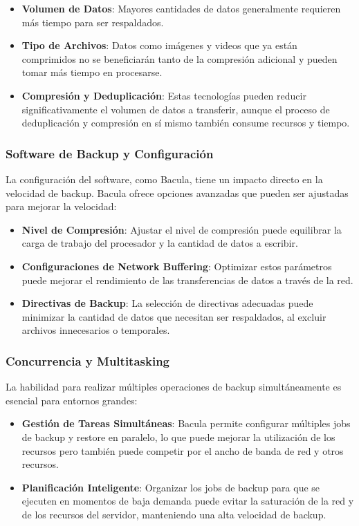 \begin{itemize}
    \item \textbf{Volumen de Datos}: Mayores cantidades de datos generalmente requieren más tiempo para ser respaldados.
    \item \textbf{Tipo de Archivos}: Datos como imágenes y videos que ya están comprimidos no se beneficiarán tanto de la compresión adicional y pueden tomar más tiempo en procesarse.
    \item \textbf{Compresión y Deduplicación}: Estas tecnologías pueden reducir significativamente el volumen de datos a transferir, aunque el proceso de deduplicación y compresión en sí mismo también consume recursos y tiempo.
\end{itemize}

\subsubsection{Software de Backup y Configuración}

La configuración del software, como Bacula, tiene un impacto directo en la velocidad de backup. Bacula ofrece opciones avanzadas que pueden ser ajustadas para mejorar la velocidad:

\begin{itemize}
    \item \textbf{Nivel de Compresión}: Ajustar el nivel de compresión puede equilibrar la carga de trabajo del procesador y la cantidad de datos a escribir.
    \item \textbf{Configuraciones de Network Buffering}: Optimizar estos parámetros puede mejorar el rendimiento de las transferencias de datos a través de la red.
    \item \textbf{Directivas de Backup}: La selección de directivas adecuadas puede minimizar la cantidad de datos que necesitan ser respaldados, al excluir archivos innecesarios o temporales.
\end{itemize}

\subsubsection{Concurrencia y Multitasking}

La habilidad para realizar múltiples operaciones de backup simultáneamente es esencial para entornos grandes:

\begin{itemize}
    \item \textbf{Gestión de Tareas Simultáneas}: Bacula permite configurar múltiples jobs de backup y restore en paralelo, lo que puede mejorar la utilización de los recursos pero también puede competir por el ancho de banda de red y otros recursos.
    \item \textbf{Planificación Inteligente}: Organizar los jobs de backup para que se ejecuten en momentos de baja demanda puede evitar la saturación de la red y de los recursos del servidor, manteniendo una alta velocidad de backup.
\end{itemize}

